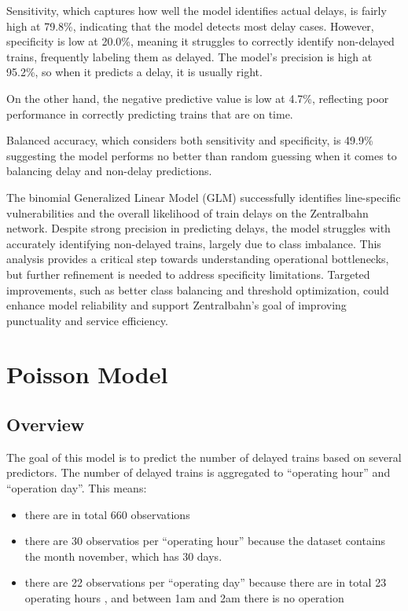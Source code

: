 \documentclass[
]{article}
\providecommand{\tightlist}{%
  \setlength{\itemsep}{0pt}\setlength{\parskip}{0pt}}
\begin{document}
Sensitivity, which captures how well the model identifies actual delays,
is fairly high at 79.8\%, indicating that the model detects most delay
cases. However, specificity is low at 20.0\%, meaning it struggles to
correctly identify non-delayed trains, frequently labeling them as
delayed. The model's precision is high at 95.2\%, so when it predicts a
delay, it is usually right.

On the other hand, the negative predictive value is low at 4.7\%,
reflecting poor performance in correctly predicting trains that are on
time.

Balanced accuracy, which considers both sensitivity and specificity, is
49.9\% suggesting the model performs no better than random guessing when
it comes to balancing delay and non-delay predictions.

The binomial Generalized Linear Model (GLM) successfully identifies
line-specific vulnerabilities and the overall likelihood of train delays
on the Zentralbahn network. Despite strong precision in predicting
delays, the model struggles with accurately identifying non-delayed
trains, largely due to class imbalance. This analysis provides a
critical step towards understanding operational bottlenecks, but further
refinement is needed to address specificity limitations. Targeted
improvements, such as better class balancing and threshold optimization,
could enhance model reliability and support Zentralbahn's goal of
improving punctuality and service efficiency.

\section{Poisson Model}\label{poisson-model}

\subsection{Overview}\label{overview}

The goal of this model is to predict the number of delayed trains based
on several predictors. The number of delayed trains is aggregated to
``operating hour'' and ``operation day''. This means:

\begin{itemize}
\tightlist
\item
  there are in total 660 observations
\item
  there are 30 observatios per ``operating hour'' because the dataset
  contains the month november, which has 30 days.
\item
  there are 22 observations per ``operating day'' because there are in
  total 23 operating hours , and between 1am and 2am there is no
  operation
\end{itemize}
\end{document}
